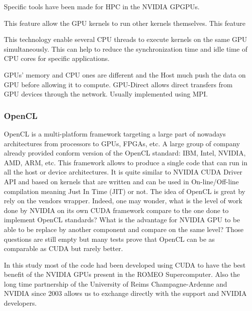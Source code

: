Specific tools have been made for HPC in the NVIDIA GPGPUs. 
\begin{description}
  \item[Dynamic Parallelism] This feature allow the GPU kernels to run other kernels themselves. This feature 
  \item[Hyper-Q] This technology enable several CPU threads to execute kernels on the same GPU simultaneously. This can help to reduce the synchronization time and idle time of CPU cores for specific applications.
  \item[NVIDIA GPU-Direct] GPUs' memory and CPU ones are different and the Host much push the data on GPU before allowing it to compute. GPU-Direct allows direct transfers from GPU devices through the network. Usually implemented using MPI.  
\end{description}

\subsubsection{OpenCL}
OpenCL is a multi-platform framework targeting a large part of nowadays architectures from processors to GPUs, FPGAs, etc.
A large group of company already provided conform version of the OpenCL standard: IBM, Intel, NVIDIA, AMD, ARM, etc.
This framework allows to produce a single code that can run in all the host or device architectures. 
It is quite similar to NVIDIA CUDA Driver API and based on kernels that are written and can be used in On-line/Off-line compilation meaning Just In Time (JIT) or not. 
The idea of OpenCL is great by rely on the vendors wrapper.
Indeed, one may wonder, what is the level of work done by NVIDIA on its own CUDA framework compare to the one done to implement OpenCL standards? 
What is the advantage for NVIDIA GPU to be able to be replace by another component and compare on the same level? 
Those questions are still empty but many tests prove that OpenCL can be as comparable as CUDA but rarely better\cite{karimi2010performance,fang2011comprehensive}. 

In this study most of the code had been developed using CUDA to have the best benefit of the NVIDIA GPUs present in the ROMEO Supercomputer. 
Also the long time partnership of the University of Reims Champagne-Ardenne and NVIDIA since 2003 allows us to exchange directly with the support and NVIDIA developers. 

